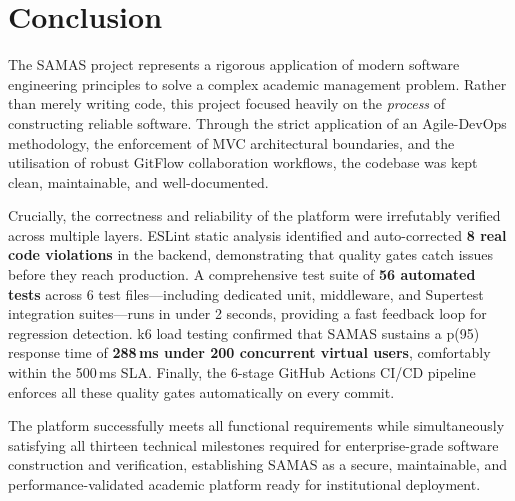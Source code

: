 \documentclass[12pt, a4paper]{report}
\begin{document}
\chapter{Conclusion}
The SAMAS project represents a rigorous application of modern software engineering principles to solve a complex academic management problem. Rather than merely writing code, this project focused heavily on the \textit{process} of constructing reliable software. Through the strict application of an Agile-DevOps methodology, the enforcement of MVC architectural boundaries, and the utilisation of robust GitFlow collaboration workflows, the codebase was kept clean, maintainable, and well-documented.

Crucially, the correctness and reliability of the platform were irrefutably verified across multiple layers. ESLint static analysis identified and auto-corrected \textbf{8 real code violations} in the backend, demonstrating that quality gates catch issues before they reach production. A comprehensive test suite of \textbf{56 automated tests} across 6 test files---including dedicated unit, middleware, and Supertest integration suites---runs in under 2 seconds, providing a fast feedback loop for regression detection. k6 load testing confirmed that SAMAS sustains a p(95) response time of \textbf{288\,ms under 200 concurrent virtual users}, comfortably within the 500\,ms SLA. Finally, the 6-stage GitHub Actions CI/CD pipeline enforces all these quality gates automatically on every commit.

The platform successfully meets all functional requirements while simultaneously satisfying all thirteen technical milestones required for enterprise-grade software construction and verification, establishing SAMAS as a secure, maintainable, and performance-validated academic platform ready for institutional deployment.

\end{document}
